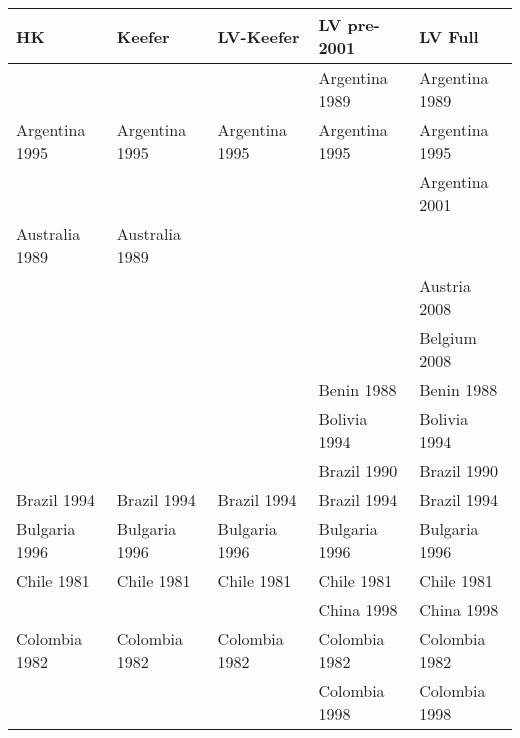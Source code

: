 \begin{table}[ht]
\centering
{\tiny
\begin{tabular}{lllll}
  \hline
\textbf{HK} & \textbf{Keefer} & \textbf{LV-Keefer} & \textbf{LV pre-2001} & \textbf{LV Full} \\ 
  \hline
 &  &  & Argentina 1989\cellcolor[gray]{0.5} & Argentina 1989\cellcolor[gray]{0.5} \\ 
  Argentina 1995\cellcolor[gray]{0.5} & Argentina 1995\cellcolor[gray]{0.5} & Argentina 1995\cellcolor[gray]{0.5} & Argentina 1995\cellcolor[gray]{0.5} & Argentina 1995\cellcolor[gray]{0.5} \\ 
   &  &  &  & Argentina 2001\cellcolor[gray]{0.5} \\ 
  Australia 1989\cellcolor[gray]{0.5} & Australia 1989\cellcolor[gray]{0.5} &  &  &  \\ 
   &  &  &  & Austria 2008\cellcolor[gray]{0.5} \\ 
   &  &  &  & Belgium 2008\cellcolor[gray]{0.5} \\ 
   &  &  & Benin 1988\cellcolor[gray]{1} & Benin 1988\cellcolor[gray]{1} \\ 
   &  &  & Bolivia 1994\cellcolor[gray]{0.5} & Bolivia 1994\cellcolor[gray]{0.5} \\ 
   &  &  & Brazil 1990\cellcolor[gray]{0.5} & Brazil 1990\cellcolor[gray]{0.5} \\ 
  Brazil 1994\cellcolor[gray]{0.5} & Brazil 1994\cellcolor[gray]{0.5} & Brazil 1994\cellcolor[gray]{0.5} & Brazil 1994\cellcolor[gray]{0.5} & Brazil 1994\cellcolor[gray]{0.5} \\ 
  Bulgaria 1996\cellcolor[gray]{0.5} & Bulgaria 1996\cellcolor[gray]{0.5} & Bulgaria 1996\cellcolor[gray]{0.5} & Bulgaria 1996\cellcolor[gray]{0.5} & Bulgaria 1996\cellcolor[gray]{0.5} \\ 
  Chile 1981\cellcolor[gray]{1} & Chile 1981\cellcolor[gray]{1} & Chile 1981\cellcolor[gray]{1} & Chile 1981\cellcolor[gray]{1} & Chile 1981\cellcolor[gray]{1} \\ 
   &  &  & China 1998\cellcolor[gray]{1} & China 1998\cellcolor[gray]{1} \\ 
  Colombia 1982\cellcolor[gray]{0.5} & Colombia 1982\cellcolor[gray]{0.5} & Colombia 1982\cellcolor[gray]{0.5} & Colombia 1982\cellcolor[gray]{0.5} & Colombia 1982\cellcolor[gray]{0.5} \\ 
   &  &  & Colombia 1998\cellcolor[gray]{0.5} & Colombia 1998\cellcolor[gray]{0.5} \\ 

\end{tabular}}
\end{table}

